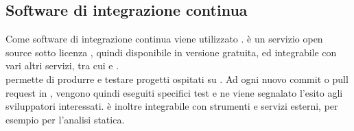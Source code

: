 \subsection{Software di integrazione continua}
Come software di integrazione continua viene utilizzato \textbf{}.
 è un servizio open source sotto licenza , quindi disponibile in versione gratuita,  ed integrabile con vari altri servizi, tra cui  e .\\  permette di produrre e testare progetti ospitati su . Ad ogni nuovo commit o pull request in , vengono quindi eseguiti specifici test e ne viene segnalato l'esito agli sviluppatori interessati.  è inoltre integrabile con strumenti e servizi esterni, per esempio per l'analisi statica.

